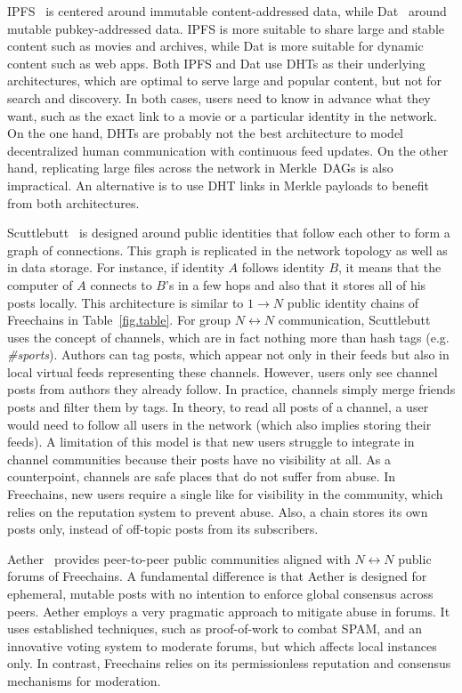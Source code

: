 \documentclass[10pt,journal,compsoc]{IEEEtran}
\newcommand{\FC}       {Freechains\xspace}
\newcommand{\Xon} {$1{\rightarrow}N$\xspace}
\newcommand{\Xnn} {$N{\leftrightarrow}N$\xspace}
\begin{document}
IPFS~\cite{p2p.ipfs} is centered around immutable content-addressed data, while
Dat~\cite{p2p.dat} around mutable pubkey-addressed data.
IPFS is more suitable to share large and stable content such as movies and
archives, while Dat is more suitable for dynamic content such as web apps.
%
Both IPFS and Dat use DHTs as their underlying architectures, which are optimal
to serve large and popular content, but not for search and discovery.
In both cases, users need to know in advance what they want, such as the exact
link to a movie or a particular identity in the network.
%
On the one hand, DHTs are probably not the best architecture to model
decentralized human communication with continuous feed updates.
On the other hand, replicating large files across the network in Merkle~DAGs is
also impractical.
An alternative is to use DHT links in Merkle payloads to benefit from both
architectures.

Scuttlebutt~\cite{p2p.scuttlebutt} is designed around public identities that
follow each other to form a graph of connections.
This graph is replicated in the network topology as well as in data storage.
For instance, if identity $A$ follows identity $B$, it means that the computer
of $A$ connects to $B$'s in a few hops and also that it stores all of his posts
locally.
This architecture is similar to \Xon public identity chains of \FC in
Table~\ref{fig.table}.
%
For group \Xnn communication, Scuttlebutt uses the concept of channels, which
are in fact nothing more than hash tags (e.g. \emph{\#sports}).
Authors can tag posts, which appear not only in their feeds but also in local
virtual feeds representing these channels.
However, users only see channel posts from authors they already follow.
In practice, channels simply merge friends posts and filter them by tags.
In theory, to read all posts of a channel, a user would need to follow all
users in the network (which also implies storing their feeds).
A limitation of this model is that new users struggle to integrate in channel
communities because their posts have no visibility at all.
As a counterpoint, channels are safe places that do not suffer from abuse.
%
In \FC, new users require a single like for visibility in the community, which
relies on the reputation system to prevent abuse.
Also, a chain stores its own posts only, instead of off-topic posts from its
subscribers.

Aether~\cite{p2p.ecosystem} provides peer-to-peer public communities aligned
with \Xnn public forums of \FC.
A fundamental difference is that Aether is designed for ephemeral, mutable
posts with no intention to enforce global consensus across peers.
Aether employs a very pragmatic approach to mitigate abuse in forums.
It uses established techniques, such as proof-of-work to combat SPAM, and an
innovative voting system to moderate forums, but which affects local instances
only.
In contrast, \FC relies on its permissionless reputation and consensus
mechanisms for moderation.
\end{document}
